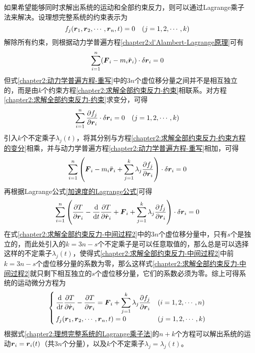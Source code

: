 如果希望能够同时求解出系统的运动和全部约束反力，则可以通过Lagrange乘子法来解决。设理想完整系统的约束表示为
\begin{equation}
	f_j(\boldsymbol{r}_1,\boldsymbol{r}_2,\cdots,\boldsymbol{r}_n,t) = 0 \quad (j = 1,2,\cdots,k)
	\label{chapter2:求解全部约束反力-约束}
\end{equation}
解除所有约束，则根据动力学普遍方程\eqref{chapter2:d'Alambert-Lagrange原理}可有
\begin{equation}
	\sum_{i=1}^n (\boldsymbol{F}_i-m_i\ddot{\boldsymbol{r}}_i)\cdot \delta \boldsymbol{r}_i = 0
	\label{chapter2:动力学普遍方程-重写}
\end{equation}
但式\eqref{chapter2:动力学普遍方程-重写}中的$3n$个虚位移分量之间并不是相互独立的，而是由$k$个约束方程\eqref{chapter2:求解全部约束反力-约束}相联系。对方程\eqref{chapter2:求解全部约束反力-约束}求变分，可得
\begin{equation}
	\sum_{i=1}^n \frac{\partial f_j}{\partial \boldsymbol{r}_i} \cdot \delta \boldsymbol{r}_i = 0\quad (j=1,2,\cdots,k)
	\label{chapter2:求解全部约束反力-约束方程的变分}
\end{equation}
引入$k$个不定乘子$\lambda_j(t)$，将其分别与方程\eqref{chapter2:求解全部约束反力-约束方程的变分}相乘，并与动力学普遍方程\eqref{chapter2:动力学普遍方程-重写}相加，可得
\begin{equation}
	\sum_{i=1}^n \left(\boldsymbol{F}_i-m_i\ddot{\boldsymbol{r}}_i + \sum_{j=1}^k \lambda_j \frac{\partial f_j}{\partial \boldsymbol{r}_i}\right) \cdot \delta \boldsymbol{r}_i = 0
	\label{chapter2:求解全部约束反力-中间过程1}
\end{equation}
再根据Lagrange公式\eqref{加速度的Lagrange公式}可得
\begin{equation}
	\sum_{i=1}^n \left(\frac{\partial T}{\partial \boldsymbol{r}_i}-\frac{\mathrm{d}}{\mathrm{d} t} \frac{\partial T}{\partial \dot{\boldsymbol{r}}_i} + \boldsymbol{F}_i+\sum_{j=1}^k \lambda_j \frac{\partial f_j}{\partial \boldsymbol{r}_i}\right) \cdot \delta \boldsymbol{r}_i = 0
	\label{chapter2:求解全部约束反力-中间过程2}
\end{equation}
在式\eqref{chapter2:求解全部约束反力-中间过程2}中的$3n$个虚位移分量中，只有$s$个是独立的，而此处引入的$k=3n-s$个不定乘子是可以任意取值的，那么总是可以选择这样的不定乘子$\lambda_j(t)$，使得式\eqref{chapter2:求解全部约束反力-中间过程2}中前$k=3n-s$个虚位移分量的系数为零，那么这样式\eqref{chapter2:求解全部约束反力-中间过程2}就只剩下相互独立的$s$个虚位移分量，它们的系数必须为零。综上可得系统的运动微分方程为
\begin{equation}
\begin{cases}
	\displaystyle \frac{\mathrm{d}}{\mathrm{d} t} \frac{\partial T}{\partial \dot{\boldsymbol{r}}_i} - \frac{\partial T}{\partial \boldsymbol{r}_i} = \boldsymbol{F}_i+\sum_{j=1}^k \lambda_j \frac{\partial f_j}{\partial \boldsymbol{r}_i} & (i = 1,2,\cdots,n) \\
	\displaystyle f_j(\boldsymbol{r}_1,\boldsymbol{r}_2,\cdots,\boldsymbol{r}_n,t) = 0 & (j=1,2,\cdots,k)
\end{cases}
\label{chapter2:理想完整系统的Lagrange乘子法}
\end{equation}
根据式\eqref{chapter2:理想完整系统的Lagrange乘子法}的$n+k$个方程可以解出系统的运动$\boldsymbol{r}_i = \boldsymbol{r}_i(t)$（共$3n$个分量），以及$k$个不定乘子$\lambda_j = \lambda_j(t)$。

